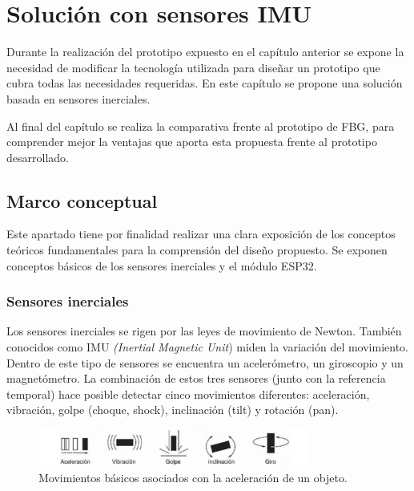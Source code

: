 \chapter{Solución con sensores IMU\label{sec:IMU}}

\label{sec:IMU4}

Durante la realización del prototipo expuesto en el capítulo anterior se expone la necesidad de modificar la tecnología utilizada para diseñar un prototipo que cubra todas las necesidades requeridas. En este capítulo se propone una solución basada en sensores inerciales. 


Al final del capítulo se realiza la comparativa frente al prototipo de FBG, para comprender mejor la ventajas que aporta esta propuesta frente al prototipo desarrollado. 

\section{Marco conceptual}
\label{sec:marco4}

Este apartado tiene por finalidad realizar una clara exposición de los conceptos teóricos fundamentales para la comprensión del diseño propuesto. Se exponen conceptos básicos de los sensores inerciales y el módulo ESP32.  


\subsection{Sensores inerciales}
\label{sec:asdf4}

Los sensores inerciales se rigen por las leyes de movimiento de Newton. También conocidos como IMU \textit{(Inertial Magnetic Unit}) miden la variación del movimiento. Dentro de este tipo de sensores se encuentra un acelerómetro, un giroscopio y un magnetómetro. La combinación de estos tres sensores (junto con la referencia temporal) hace posible detectar cinco movimientos diferentes: aceleración, vibración, golpe (choque, shock), inclinación (tilt) y rotación (pan).

\begin{figure}[H]
	\centering
	\includegraphics[width=0.8\textwidth]{./img/movimientoAcelera}
	\caption{Movimientos básicos asociados con la aceleración de un objeto. \cite{juanDiego}} 
	\label{fig:movimientosAcelera}
\end{figure} 


